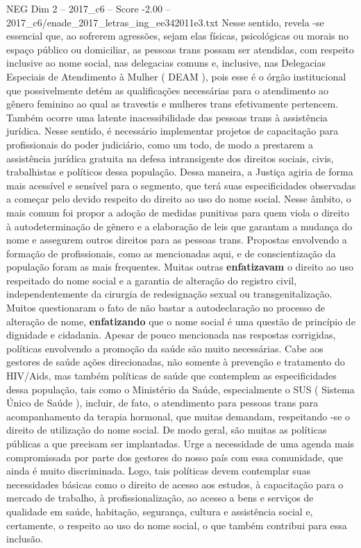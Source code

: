 \begin{textsample}{NEG Dim 2 – 2017\_c6 – Score -2.00 – 2017\_c6/enade\_2017\_letras\_ing\_ee342011e3.txt}
Nesse sentido, revela -se essencial que, ao sofrerem agressões, sejam elas físicas, psicológicas ou morais no espaço público ou domiciliar, as pessoas trans possam ser atendidas, com respeito inclusive ao nome social, nas delegacias comuns e, inclusive, nas Delegacias Especiais de Atendimento à Mulher ( DEAM ), pois esse é o órgão institucional que possivelmente detém as qualificações necessárias para o atendimento ao gênero feminino ao qual as travestis e mulheres trans efetivamente pertencem.
Também ocorre uma latente inacessibilidade das pessoas trans à assistência jurídica.
Nesse sentido, é necessário implementar projetos de capacitação para profissionais do poder judiciário, como um todo, de modo a prestarem a assistência jurídica gratuita na defesa intransigente dos direitos sociais, civis, trabalhistas e políticos dessa população.
Dessa maneira, a Justiça agiria de forma mais acessível e sensível para o segmento, que terá suas especificidades observadas a começar pelo devido respeito do direito ao uso do nome social.
Nesse âmbito, o mais comum foi propor a adoção de medidas punitivas para quem viola o direito à autodeterminação de gênero e a elaboração de leis que garantam a mudança do nome e assegurem outros direitos para as pessoas trans.
Propostas envolvendo a formação de profissionais, como as mencionadas aqui, e de conscientização da população foram as mais frequentes.
Muitas outras \textbf{enfatizavam} o direito ao uso respeitado do nome social e a garantia de alteração do registro civil, independentemente da cirurgia de redesignação sexual ou transgenitalização.
Muitos questionaram o fato de não bastar a autodeclaração no processo de alteração de nome, \textbf{enfatizando} que o nome social é uma questão de princípio de dignidade e cidadania.
Apesar de pouco mencionada nas respostas corrigidas, políticas envolvendo a promoção da saúde são muito necessárias.
Cabe aos gestores de saúde ações direcionadas, não somente à prevenção e tratamento do HIV/Aids, mas também políticas de saúde que contemplem as especificidades dessa população, tais como o Ministério da Saúde, especialmente o SUS ( Sistema Único de Saúde ), incluir, de fato, o atendimento para pessoas trans para acompanhamento da terapia hormonal, que muitas demandam, respeitando -se o direito de utilização do nome social.
De modo geral, são muitas as políticas públicas a que precisam ser implantadas.
Urge a necessidade de uma agenda mais compromissada por parte dos gestores do nosso país com essa comunidade, que ainda é muito discriminada.
Logo, tais políticas devem contemplar suas necessidades básicas como o direito de acesso aos estudos, à capacitação para o mercado de trabalho, à profissionalização, ao acesso a bens e serviços de qualidade em saúde, habitação, segurança, cultura e assistência social e, certamente, o respeito ao uso do nome social, o que também contribui para essa inclusão.

\end{textsample}
